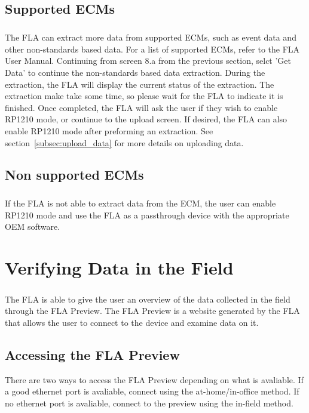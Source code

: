 \documentclass[11pt, oneside]{book}
\begin{document}
\section{Supported ECMs}
\paragraph{  }
The FLA can extract more data from supported ECMs, such as event data and other non-standards based data. For a list of supported ECMs, refer to the FLA User Manual. Continuing from screen 8.a from the previous section, selct 'Get Data' to continue the non-standards based data extraction. During the extraction, the FLA will display the current status of the extraction. The extraction make take some time, so please wait for the FLA to indicate it is finished. Once completed, the FLA will ask the user if they wish to enable RP1210 mode, or continue to the upload screen. If desired, the FLA can also enable RP1210 mode after preforming an extraction. See section~\ref{subsec:upload_data} for more details on uploading data.

\section{Non supported ECMs}
\paragraph{  }
If the FLA is not able to extract data from the ECM, the user can enable RP1210 mode and use the FLA as a passthrough device with the appropriate OEM software.

\chapter{Verifying Data in the Field}
\paragraph{  }
The FLA is able to give the user an overview of the data collected in the field through the FLA Preview. The FLA Preview is a website generated by the FLA that allows the user to connect to the device and examine data on it.
\section{Accessing the FLA Preview}
There are two ways to access the FLA Preview depending on what is avaliable. If a good ethernet port is avaliable, connect using the at-home/in-office method. If no ethernet port is avaliable, connect to the preview using the in-field method.
\end{document}
